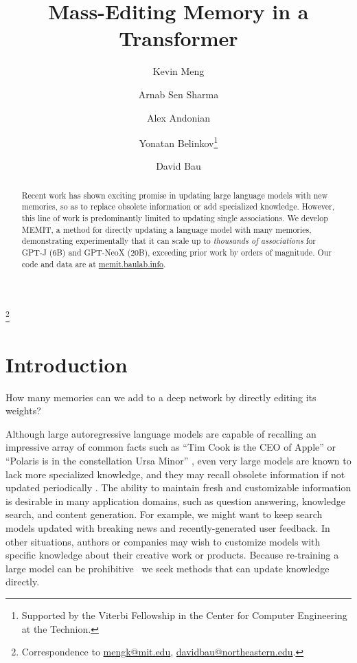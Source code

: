 \documentclass{article} %
\title{Mass-Editing Memory in a Transformer}
\author[1,2]{Kevin Meng}
\author[2]{Arnab Sen Sharma}
\author[1]{Alex Andonian}
\author[3]{Yonatan Belinkov\thanks{Supported by the Viterbi Fellowship in the Center for Computer Engineering at the Technion.}\hspace{5pt}}
\author[2]{David Bau}
\affil[1]{MIT CSAIL \vspace{\bottomv}}
\affil[2]{Northeastern University \vspace{\bottomv}}
\affil[3]{Technion -- IIT \vspace{\bottomv}}
\newcommand{\method}{MEMIT\xspace}
\newcommand\blfootnote[1]{%
  \begingroup
  \renewcommand\thefootnote{}\footnote{#1}%
  \addtocounter{footnote}{-1}%
  \endgroup
}
\renewcommand{\thefootnote}{\arabic{footnote}}
\newcommand{\iclrnew}[1]{#1}
\begin{document}
\maketitle

\blfootnote{Correspondence to \href{mailto:mengk@mit.edu}{mengk@mit.edu}, \href{mailto:davidbau@northeastern.edu}{davidbau@northeastern.edu}.}


\begin{abstract}
\vspace{-5pt}
Recent work has shown exciting promise in updating large language models with new memories, so as to replace obsolete information or add specialized knowledge. However, this line of work is predominantly limited to updating single associations. We develop \method, a method for directly updating a language model with many memories, demonstrating experimentally that it can scale up to \textit{thousands of associations} for GPT-J (6B) and GPT-NeoX (20B), exceeding prior work by orders of magnitude. Our code and data are at \href{https://memit.baulab.info}{memit.baulab.info}.
\vspace{-6pt}
\end{abstract}


\section{Introduction}

How many memories can we add to a deep network by directly editing its weights?

Although large autoregressive language models \citep{gpt2, gpt3, gpt-j, gpt-neox-20b} are capable of recalling an impressive array of common facts such as ``Tim Cook is the CEO of Apple'' or ``Polaris is in the constellation Ursa Minor'' \citep{petroni2020context, gpt3}, even very large models are known to lack more specialized knowledge, and they may recall obsolete information if not updated periodically \citep{lazaridou2021mind, agarwal2022temporal, liska2022streamingqa}. 
\iclrnew{%
The ability to maintain fresh and customizable information is desirable in many application domains, such as question answering, knowledge search, and content generation. For example, we might want to keep search models updated with breaking news and recently-generated user feedback. In other situations, authors or companies may wish to customize models with specific knowledge about their creative work or products.
Because re-training a large model can be prohibitive~\citep{patterson2021carbon} %
we seek methods that can update knowledge directly.}
\end{document}
